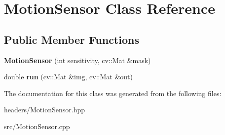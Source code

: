 \hypertarget{classMotionSensor}{\section{Motion\-Sensor Class Reference}
\label{classMotionSensor}
}
\subsection*{Public Member Functions}
\begin{DoxyCompactItemize}
\item 
\hypertarget{classMotionSensor_af2f1013fcff9a706249bfa0043e1cca1}{{\bfseries Motion\-Sensor} (int sensitivity, cv\-::\-Mat \&mask)}\label{classMotionSensor_af2f1013fcff9a706249bfa0043e1cca1}

\item 
\hypertarget{classMotionSensor_a6dc19202befbb6eac2fb7a4d1d3d96e5}{double {\bfseries run} (cv\-::\-Mat \&img, cv\-::\-Mat \&out)}\label{classMotionSensor_a6dc19202befbb6eac2fb7a4d1d3d96e5}

\end{DoxyCompactItemize}


The documentation for this class was generated from the following files\-:\begin{DoxyCompactItemize}
\item 
headers/Motion\-Sensor.\-hpp\item 
src/Motion\-Sensor.\-cpp\end{DoxyCompactItemize}
